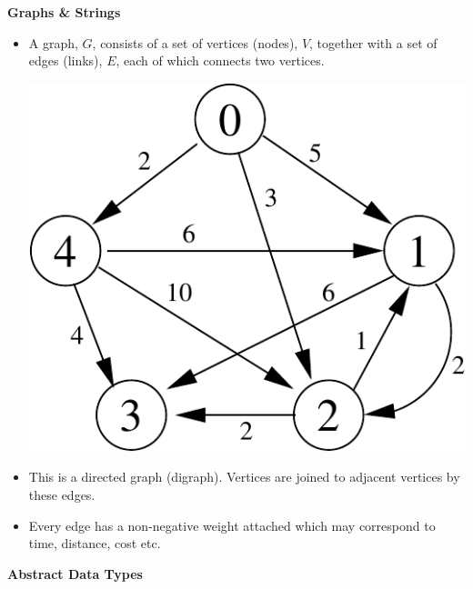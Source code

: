 \documentclass[a4,portraitt]{slides}
\begin{document}
{\newpage
{\samepage
\begin{center}
{\Large{\bf Graphs \& Strings}}
\end{center}
\begin{itemize}
\item A graph, $G$, consists of a set of vertices (nodes), $V$, together
with a set of edges (links), $E$, each of which connects two vertices.
\begin{center}
\includegraphics{../Images/grapha.pdf}
\end{center}
\item This is a directed graph (digraph).
Vertices are joined to adjacent vertices by these edges.
\item Every edge has a non-negative weight attached
which may correspond to time, distance, cost etc.
\end{itemize}
}

\newpage
{\samepage
\begin{center}
{\Large{\bf Abstract Data Types}}
\end{center}

}}
\end{document}
